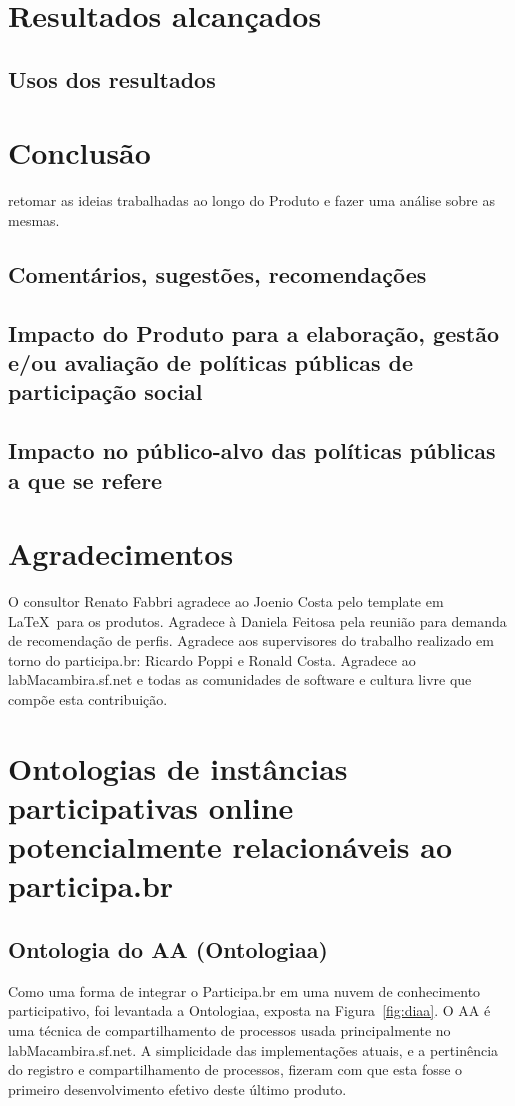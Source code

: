 \documentclass[12pt]{article}
\begin{document}
\section{Resultados alcançados}
\subsection{Usos dos resultados}\label{sec:uso}
\section{Conclusão}
retomar as ideias trabalhadas ao longo do Produto e fazer uma análise sobre as mesmas.
\subsection{Comentários, sugestões, recomendações}
\subsection{Impacto do Produto para a elaboração, gestão e/ou avaliação de políticas públicas de participação social}
\subsection{Impacto no público-alvo das políticas públicas a que se refere}
\section{Agradecimentos}
O consultor Renato Fabbri agradece ao Joenio Costa pelo template em \LaTeX\ para os produtos. Agradece à Daniela Feitosa pela reunião para demanda de recomendação de perfis. Agradece aos supervisores do trabalho realizado em torno do participa.br: Ricardo Poppi e Ronald Costa. Agradece ao labMacambira.sf.net e todas as comunidades de software e cultura livre que compõe esta contribuição.
\newpage

\newpage

\newpage
\printindex
\newpage
%
\appendix
\section{Ontologias de instâncias participativas online potencialmente relacionáveis ao participa.br}
\subsection{Ontologia do AA (Ontologiaa)}\label{ap:aa}
Como uma forma de integrar o Participa.br em uma nuvem de conhecimento participativo, foi levantada a Ontologiaa, exposta na Figura~\ref{fig:diaa}. O AA é uma técnica de compartilhamento de processos usada principalmente no labMacambira.sf.net. A simplicidade das implementações atuais, e a pertinência do registro e compartilhamento de processos, fizeram com que esta fosse o primeiro desenvolvimento efetivo deste último produto.
\end{document}
